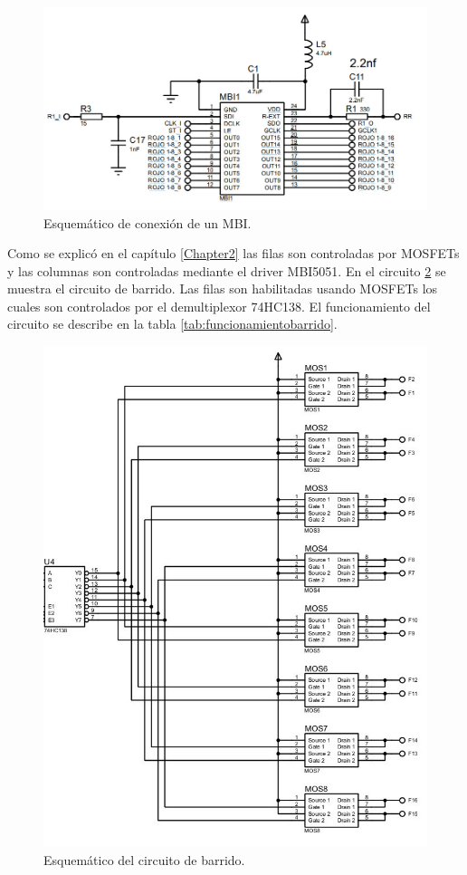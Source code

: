 \begin{figure}[htpb]
	\centering
    \includegraphics[scale=0.5]{Figures/circuitombi.jpg} 
	\caption{Esquemático de conexión de un MBI.}
	\label{fig:circuitombi}
\end{figure}



Como se explicó en el capítulo \ref{Chapter2} las filas son controladas por MOSFETs y las columnas son controladas mediante el driver MBI5051. En el circuito \ref{fig:circuitobarrido} se muestra el circuito de barrido. Las filas son habilitadas usando MOSFETs los cuales son controlados por el demultiplexor 74HC138. El funcionamiento del circuito se describe en la tabla \ref{tab:funcionamientobarrido}.

\begin{figure}[htpb]
	\centering
    \includegraphics[scale=0.6]{Figures/circuitoBarrido.jpg} 
	\caption{Esquemático del circuito de barrido.}
	\label{fig:circuitobarrido}
\end{figure}


